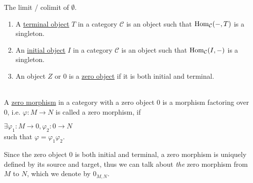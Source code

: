 \begin{remark}\label{def:init_term_zero_object}
The limit / colimit of $\emptyset$.
\renewcommand{\labelenumi}{(\theenumi)}
\begin{enumerate}
\item A \ul{terminal object} $T$ in a category $\mathcal{C}$ is an object such that $\textup{Hom}_{\mathcal{C}}(-,T)$ is a singleton.
\item An \ul{initial object} $I$ in a category $\mathcal{C}$ is an object such that $\textup{Hom}_{\mathcal{C}}(I,-)$ is a singleton.
\item An object $Z$ or $0$ is a \ul{zero object} if it is both initial and terminal.
\end{enumerate}
\end{remark}

\begin{definition}\label{def:zero_morphism}\phantom{}\\
A \ul{zero morphism} in a category with a zero object $0$ is a morphism factoring over $0$, i.e. $\varphi : M \rightarrow N$ is called a zero
morphism, if\\
\begin{minipage}{.35\textwidth}
\end{minipage}
\begin{minipage}{.65\textwidth}
$\exists \varphi_{1} : M \rightarrow 0, \varphi_{2} : 0 \rightarrow N$\\
such that $\varphi = \varphi_{1}\varphi_{2}$.
\end{minipage}
Since the zero object $0$ is both initial and terminal, a zero morphism is uniquely defined by its source and target, thus we can
talk about \textit{the} zero morphism from $M$ to $N$, which we denote by $0_{M,N}$.
\end{definition}

